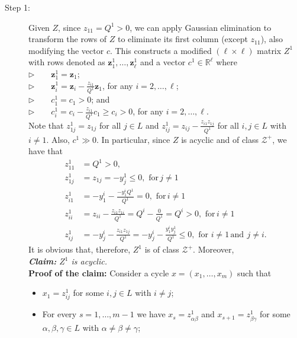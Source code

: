 \documentclass[11pt,fleqn]{article}
\begin{document}
\begin{description}
	\item[Step 1:] Given $Z$, since $z_{11} = Q^1 >0$, we can apply Gaussian elimination to transform the rows of $Z$ to eliminate its first column (except $z_{11}$), also modifying the vector $c$. This constructs a modified $(\ell \times \ell)$ matrix $Z^1$ with rows denoted as $\mathbf{z}^1_1 , \ldots , \mathbf{z}^1_\ell$ and a vector $c^1 \in \mathbb R^\ell$ where \\[1ex] 
	$\triangleright \qquad \mathbf{z}^1_1 = \mathbf{z}_1$; \\[1ex] 
	$\triangleright \qquad \mathbf{z}^1_i = \mathbf{z}_i - \frac{z_{i1}}{Q^1} \mathbf{z}_1$, for any $i = 2, \ldots , \ell$; \\[1ex] 
	$\triangleright \qquad c^1_1 = c_1 >0$; and \\[1ex] 
	$\triangleright \qquad c^1_i = c_i - \frac{z_{i1}}{Q^1} c_1 \geqslant c_i >0$, for any $i = 2, \ldots , \ell$. \\[1ex] 
	Note that $z^1_{1j} = z_{1j}$ for all $j \in L$ and $z^1_{ij} = z_{ij} - \frac{z_{i1} z_{1j}}{Q^1}$ for all $i,j \in L$ with $i \neq 1$. Also, $c^1 \gg 0$. In particular, since $Z$ is acyclic and of class $\mathcal Z^+$, we have that
	\begin{align*}
	z^1_{11}&=Q^1>0,\\
		z^1_{1j} & = z_{1j} = - y^1_j \leqslant 0,\,\,\mbox{for}\, j \neq 1\\
	z^1_{i1} & = -y^i_1 - \frac{-y^i_1 Q^1}{Q^1} =0,\,\,\mbox{for}\, i \neq 1\\
		z^1_{ii} & = z_{ii}  - \frac{z_{i1} z_{1i}}{Q^1} = Q^i - \frac{0}{Q^1} = Q^i >0,\,\,\mbox{for} \, i \neq 1 \\
	z^1_{ij} & = - y^i_j - \frac{z_{i1} z_{1j}}{Q^1} = - y^i_j - \frac{y^i_1 y^1_j}{Q^1} \leqslant 0, \,\,\mbox{for}\,\, i \neq 1\,\mbox{and}\, \ j  \neq i. 
		\end{align*}
	It is obvious that, therefore, $Z^1$ is of class $\mathcal Z^+$. Moreover, \\[1ex]
	\emph{\textbf{Claim:} $Z^1$ is acyclic.} \\
	\textbf{Proof of the claim:} Consider a cycle $x =(x_1, \ldots , x_m)$ such that
	\begin{itemize}
		\item $x_1 = z^1_{ij}$ for some $i,j \in L$ with $i \neq j$;
		\item For every $s = 1, \ldots ,m-1$ we have $x_s = z^1_{\alpha \beta}$ and $x_{s+1} = z^1_{\beta \gamma}$ for some $\alpha , \beta ,\gamma \in L$ with $\alpha \neq \beta \neq \gamma$;

\end{itemize}
\end{description}
\end{document}

